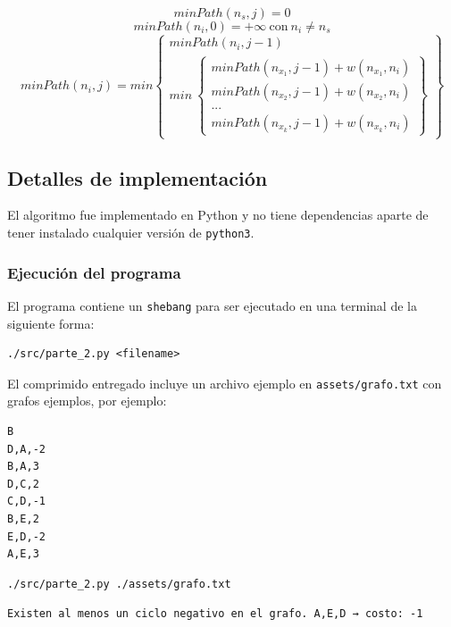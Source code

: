 \documentclass[titlepage,a4paper]{article}
\begin{document}
$$minPath(n_s, j) = 0$$
$$minPath(n_i, 0) = +\infty\ \text{con}\ n_i \neq n_s$$
$$
minPath(n_i, j) = min \left\{\begin{array}{lcc}
                        minPath(n_i, j-1) \\
                        min\ \left\{\begin{array}{lcc}
                               minPath(n_x_1, j-1) + w(n_x_1,n_i) \\
                               minPath(n_x_2, j-1) + w(n_x_2,n_i) \\
                               ... \\
                               minPath(n_x_k, j-1) + w(n_x_k,n_i)
                             \end{array}\right\}
                      \end{array}\right\}
$$

\subsection{Detalles de implementación}
\label{sec:org7a75b3c}

El algoritmo fue implementado en Python y no tiene dependencias aparte de tener
instalado cualquier versión de \texttt{python3}.

\subsubsection{Ejecución del programa}
\label{sec:orgc9cb113}

El programa contiene un \texttt{shebang} para ser ejecutado en una terminal de la
siguiente forma:

\begin{verbatim}
./src/parte_2.py <filename>
\end{verbatim}

El comprimido entregado incluye un archivo ejemplo en \texttt{assets/grafo.txt} con grafos ejemplos,
por ejemplo:

\begin{verbatim}
B
D,A,-2
B,A,3
D,C,2
C,D,-1
B,E,2
E,D,-2
A,E,3
\end{verbatim}

\begin{verbatim}
./src/parte_2.py ./assets/grafo.txt
\end{verbatim}

\begin{verbatim}
Existen al menos un ciclo negativo en el grafo. A,E,D → costo: -1
\end{verbatim}
\end{document}
